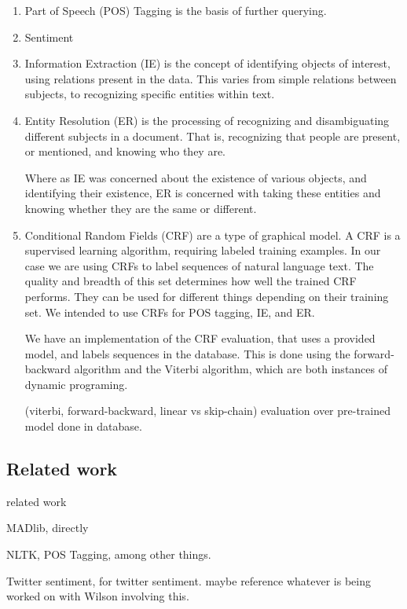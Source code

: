 \documentclass{article}
\begin{document}
\begin{enumerate}
\begin{enumerate}
  \item Part of Speech (POS) Tagging is the basis of further querying.


  \item Sentiment


  \item Information Extraction (IE) is the concept of identifying objects of interest,
    using relations present in the data.
    This varies from simple relations between subjects,
    to recognizing specific entities within text.


  \item Entity Resolution (ER) is the processing of recognizing and disambiguating different subjects in a document.
    That is, recognizing that people are present,
    or mentioned, and knowing who they are.

    Where as IE was concerned about the existence of various objects,
    and identifying their existence,
    ER is concerned with taking these entities and knowing whether they are the same or different.


  \item Conditional Random Fields (CRF) are a type of graphical model.
    A CRF is a supervised learning algorithm, requiring labeled training examples.
    In our case we are using CRFs to label sequences of natural language text.
    The quality and breadth of this set determines how well the trained CRF performs.
    They can be used for different things depending on their training set.
    We intended to use CRFs for POS tagging, IE, and ER.

    We have an implementation of the CRF evaluation, that uses a provided model, and labels sequences in the database.
    This is done using the forward-backward algorithm and the Viterbi algorithm, which are both instances of dynamic programing.

    (viterbi, forward-backward, linear vs skip-chain) evaluation over pre-trained model done in database.

  \end{enumerate}
  \subsection{Related work}

  related work

  MADlib, directly

  NLTK, POS Tagging, among other things.

  Twitter sentiment, for twitter sentiment. maybe reference whatever is being worked on with Wilson involving this.


\end{enumerate}
\end{document}
